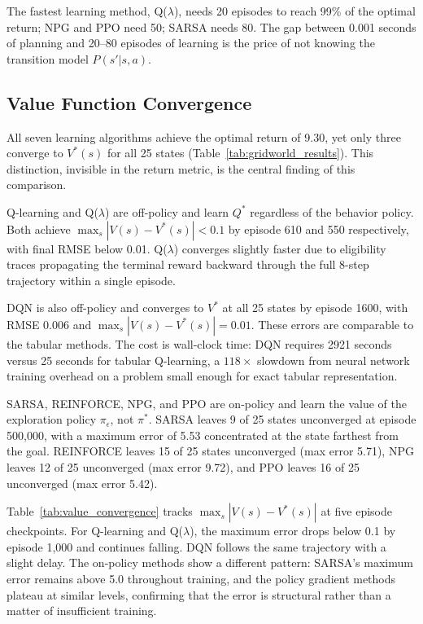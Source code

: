 The fastest learning method, Q($\lambda$), needs 20 episodes to reach 99\% of the optimal return; NPG and PPO need 50; SARSA needs 80. The gap between 0.001 seconds of planning and 20--80 episodes of learning is the price of not knowing the transition model $P(s'|s,a)$.


\subsection{Value Function Convergence}
\label{sec:illustrated_convergence}

All seven learning algorithms achieve the optimal return of 9.30, yet only three converge to $V^*(s)$ for all 25 states (Table~\ref{tab:gridworld_results}). This distinction, invisible in the return metric, is the central finding of this comparison.

Q-learning and Q($\lambda$) are off-policy and learn $Q^*$ regardless of the behavior policy. Both achieve $\max_s |V(s) - V^*(s)| < 0.1$ by episode 610 and 550 respectively, with final RMSE below 0.01. Q($\lambda$) converges slightly faster due to eligibility traces propagating the terminal reward backward through the full 8-step trajectory within a single episode.

DQN is also off-policy and converges to $V^*$ at all 25 states by episode 1600, with RMSE 0.006 and $\max_s |V(s) - V^*(s)| = 0.01$. These errors are comparable to the tabular methods. The cost is wall-clock time: DQN requires 2921 seconds versus 25 seconds for tabular Q-learning, a $118\times$ slowdown from neural network training overhead on a problem small enough for exact tabular representation.

SARSA, REINFORCE, NPG, and PPO are on-policy and learn the value of the exploration policy $\pi_\epsilon$, not $\pi^*$. SARSA leaves 9 of 25 states unconverged at episode 500,000, with a maximum error of 5.53 concentrated at the state farthest from the goal. REINFORCE leaves 15 of 25 states unconverged (max error 5.71), NPG leaves 12 of 25 unconverged (max error 9.72), and PPO leaves 16 of 25 unconverged (max error 5.42).

Table~\ref{tab:value_convergence} tracks $\max_s |V(s) - V^*(s)|$ at five episode checkpoints. For Q-learning and Q($\lambda$), the maximum error drops below 0.1 by episode 1,000 and continues falling. DQN follows the same trajectory with a slight delay. The on-policy methods show a different pattern: SARSA's maximum error remains above 5.0 throughout training, and the policy gradient methods plateau at similar levels, confirming that the error is structural rather than a matter of insufficient training.

